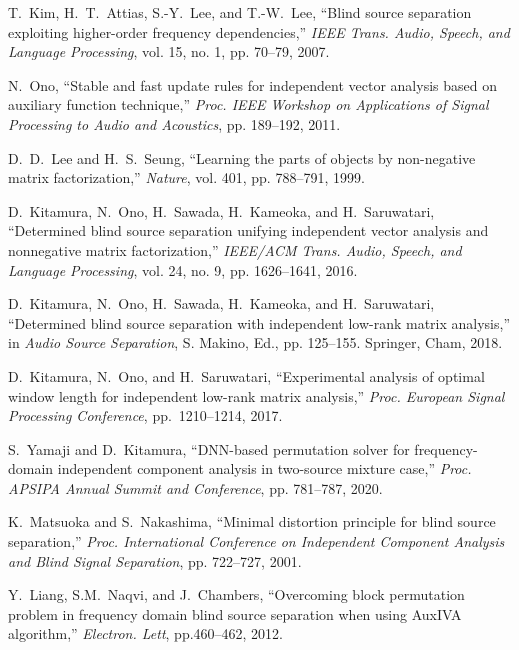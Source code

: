 \documentclass[honka]{nitkagawathesis}%
\begin{document}
\begin{thebibliography}{99}
  T.~Kim, H.~T.~Attias, S.-Y.~Lee, and T.-W.~Lee, ``Blind source separation exploiting higher-order frequency dependencies,'' \textit{IEEE Trans. Audio, Speech, and Language Processing}, vol. 15, no. 1, pp. 70--79, 2007.
  
  N.~Ono, ``Stable and fast update rules for independent vector analysis based on auxiliary function technique,'' \textit{Proc. IEEE Workshop on Applications of Signal Processing to Audio and Acoustics}, pp. 189--192, 2011.
  
  D.~D.~Lee and H.~S.~Seung, ``Learning the parts of objects by non-negative matrix factorization,'' \textit{Nature}, vol. 401, pp. 788--791, 1999.
  
  D.~Kitamura, N.~Ono, H.~Sawada, H.~Kameoka, and H.~Saruwatari, ``Determined blind source separation unifying independent vector analysis and nonnegative matrix factorization,''  \textit{IEEE/ACM Trans. Audio, Speech, and Language Processing}, vol. 24, no. 9, pp. 1626--1641, 2016.
  
  D.~Kitamura, N.~Ono, H.~Sawada, H.~Kameoka, and H.~Saruwatari, ``Determined blind source separation with independent low-rank matrix analysis,'' in  \textit{Audio Source Separation}, S. Makino, Ed., pp. 125--155. Springer, Cham, 2018.
  
  D.~Kitamura, N.~Ono, and H.~Saruwatari, ``Experimental analysis of optimal window length for independent low-rank matrix analysis,''  \textit{Proc. European Signal Processing Conference}, pp.~1210--1214, 2017.

  S.~Yamaji and D.~Kitamura, ``DNN-based permutation solver for frequency-domain independent component analysis in two-source mixture case,'' \textit{Proc. APSIPA Annual Summit and Conference}, pp. 781--787, 2020.
  
  
  K.~Matsuoka and S.~Nakashima, ``Minimal distortion principle for blind source separation,'' \textit{Proc. International Conference on Independent Component Analysis and Blind Signal Separation}, pp. 722--727, 2001.
  
  Y.~Liang, S.M.~Naqvi, and J.~Chambers, ``Overcoming block permutation
  problem in frequency domain blind source separation when using
  AuxIVA algorithm,'' \textit{Electron. Lett}, pp.460--462, 2012.


\end{thebibliography}
\end{document}

